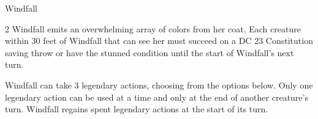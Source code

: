 \documentclass[10pt,a4paper,twoside,bg=print,twocolumn,openany,nodeprecatedcode]{dndbook}
\begin{document}
\begin{DndMonster}[float*=b,width=\textwidth + 8pt]{Windfall}
\begin{multicols}{2}
Windfall emits an overwhelming array of colors from her coat. Each creature within 30 feet of Windfall that can see her must succeed on a DC 23 Constitution saving throw or have the stunned condition until the start of Windfall's next turn.

Windfall can take 3 legendary actions, choosing from the options below. Only one legendary action can be used at a time and only at the end of another creature's turn. Windfall regains spent legendary actions at the start of its turn.

\begin{DndMonsterLegendaryActions}
\end{DndMonsterLegendaryActions}
\end{multicols}
\end{DndMonster}
\end{document}

